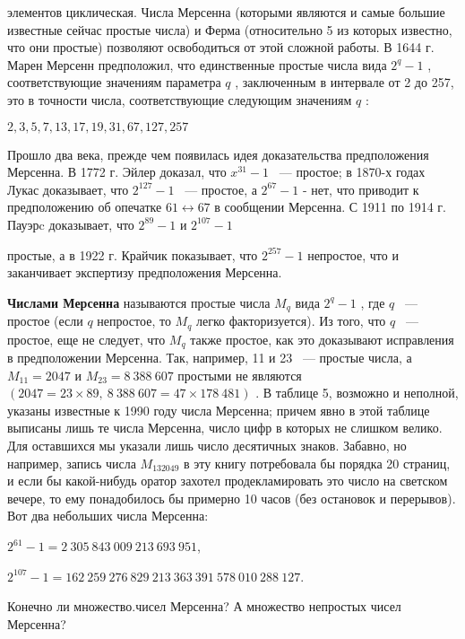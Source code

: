элементов циклическая. Числа Мерсенна (которыми являются и самые 
большие известные сейчас простые числа) и Ферма (относительно 5 из 
которых известно, что они простые) позволяют освободиться от этой 
сложной работы. 
В 1644 г. Марен Мерсенн предположил, что единственные простые 
числа вида $2^q-1$
, соответствующие значениям параметра $q$
,  
заключенным в интервале от 2 до 257, это в точности числа, соответствующие 
следующим значениям $q$
:

\begin{center}
$2,3,5,7,13,17,19,31,67,127,257$
\end{center}

Прошло два века, прежде чем появилась идея доказательства  
предположения Мерсенна. В 1772 г. Эйлер доказал, что $x^{31} - 1$
 ~— простое; в 
1870-х годах Лукас доказывает, что $2^{127}-1$
 ~— простое, а $2^{67}-1$
 - 
нет, что приводит к предположению об опечатке $61\leftrightarrow 67$
 в сообщении 
Мерсенна. С 1911 по 1914 г. Пауэрc доказывает, что $2^{89}-1$
 и $2^{107}-1$
 
простые, а в 1922 г. Крайчик показывает, что $2^{257}-1$
 непростое, что 
и заканчивает экспертизу предположения Мерсенна. 

{\bf Числами Мерсенна} называются простые числа $M_q$
 вида $2^q-1$
 , 
где $q$
 ~— простое (если $q$
 непростое, то $M_q$
 легко факторизуется). Из 
того, что $q$
 ~— простое, еще не следует, что $M_q$
 также простое, как это 
доказывают исправления в предположении Мерсенна. Так, например, 
11 и 23 ~— простые числа, а $M_{11}=2047$
 и $M_{23}=8\ 388\ 607$
 простыми не 
являются $(2047=23\times 89,\ 8\ 388\ 607=47\times 178\ 481)$
. 
В таблице 5, возможно и неполной, указаны известные к 1990 году 
числа Мерсенна; причем явно в этой таблице выписаны лишь те числа 
Мерсенна, число цифр в которых не слишком велико. Для оставшихся 
мы указали лишь число десятичных знаков. Забавно, но например,  
запись числа $M_{132049}$
 в эту книгу потребовала бы порядка 20 страниц, 
и если бы какой-нибудь оратор захотел продекламировать это число 
на светском вечере, то ему понадобилось бы примерно 10 часов (без 
остановок и перерывов). Вот два небольших числа Мерсенна:

\begin{center}
$2^{61}-1 = 2\ 305\ 843\ 009\ 213\ 693\ 951$,

$2^{107}-1= 162\ 259\ 276\ 829\ 213\ 363\ 391\ 578\ 010\ 288\ 127$.
\end{center}


Конечно ли множество.чисел Мерсенна? А множество непростых чисел 
Мерсенна?

